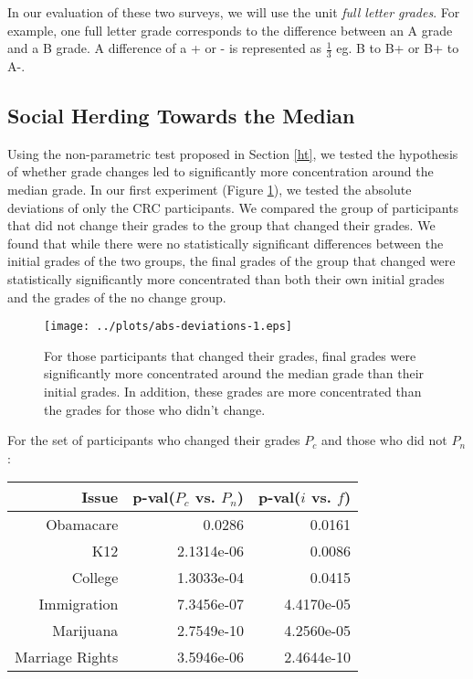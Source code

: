 In our evaluation of these two surveys, we will use the unit \emph{full letter grades}.
For example, one full letter grade corresponds to the difference between an A grade and a B grade. 
A difference of a + or - is represented as $\frac{1}{3}$ eg. B to B+ or B+ to A-. 

\subsection{Social Herding Towards the Median}
Using the non-parametric test proposed in Section \ref{ht}, we tested the hypothesis of whether grade changes led to significantly more concentration around the median grade.
In our first experiment (Figure \ref{mdev-1}), we tested the absolute deviations of only the CRC participants.
We compared the group of participants that did not change their grades to the group that changed their grades.
We found that while there were no statistically significant differences between the initial grades of the two groups, the final grades of the group that changed were statistically significantly more concentrated than both their own initial grades and the grades of the no change group.
\begin{figure}[h]
  \centering
    \texttt{[image: ../plots/abs-deviations-1.eps]}
      \caption{For those participants that changed their grades, final grades were significantly more concentrated around the median grade than their initial grades. In addition, these grades are more concentrated than the grades for those who didn't change.}
      \label{mdev-1}
\end{figure}

For the set of participants who changed their grades $P_c$ and those who did not $P_n$:

\begin{tabular}[!ht] { r | r | r }
\label{dev-2}
  Issue & p-val($P_c$ vs. $P_n$) & p-val($i$ vs. $f$) \\
  \hline
  \hline
  Obamacare &  0.0286 & 0.0161 \\
  \hline
  K12 & 2.1314e-06 &  0.0086 \\
  \hline
  College & 1.3033e-04 & 0.0415 \\
  \hline
  Immigration & 7.3456e-07 &4.4170e-05\\
  \hline
  Marijuana & 2.7549e-10 & 4.2560e-05\\
  \hline
  Marriage Rights & 3.5946e-06 & 2.4644e-10 \\
\end{tabular}\\[1\baselineskip]

